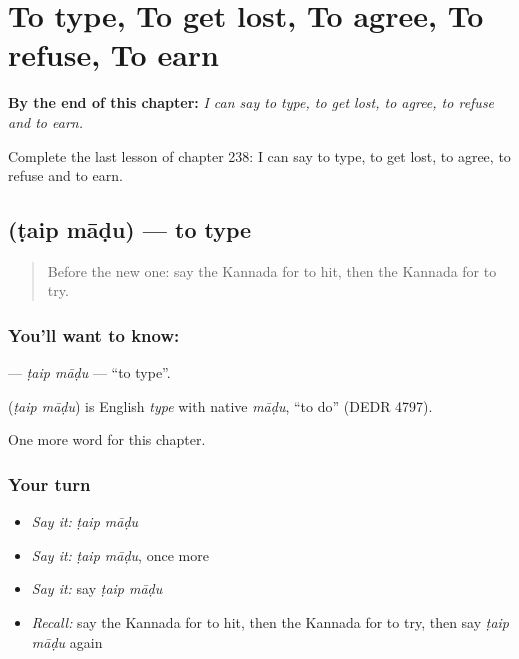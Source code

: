 
\chapter{To type, To get lost, To agree, To refuse, To earn}
\label{ch:ka-to-type-to-get-lost-to-agree-to-refuse-to-earn}

\begin{chapteropening}
\textbf{By the end of this chapter:} \emph{I can say to type, to get lost, to agree, to refuse and to earn.}

Complete the last lesson of chapter 238: I can say to type, to get lost, to agree, to refuse and to earn.
\end{chapteropening}

\section[\texorpdfstring{\kn{ಟೈಪ್} \kn{ಮಾಡು} (ṭaip māḍu)}{ಟೈಪ್ ಮಾಡು (ṭaip māḍu)}]{  (ṭaip māḍu) — to type}

\label{lesson:KA-C238-taip-madu}



\begin{quote}
Before the new one: say the Kannada for to hit, then the Kannada for to try.
\end{quote}

\subsection*{You'll want to know:  }
\textbf{ } — \emph{ṭaip māḍu} — \textquotedblleft{}to type\textquotedblright{}.

\begin{cousinweb}
\textbf{ } (\emph{ṭaip māḍu}) is English \emph{type} with native \emph{māḍu}, \textquotedblleft{}to do\textquotedblright{} (DEDR 4797).
\end{cousinweb}

\begin{grammarlens}[title={What you've built}]
One more word for this chapter.
\end{grammarlens}

\subsection*{Your turn}
\begin{itemize}
\raggedright
  \item \emph{Say it:} \emph{ṭaip māḍu}
  \item \emph{Say it:} \emph{ṭaip māḍu}, once more
  \item \emph{Say it:} say \emph{ṭaip māḍu}
  \item \emph{Recall:} say the Kannada for to hit, then the Kannada for to try, then say \emph{ṭaip māḍu} again
\end{itemize}

